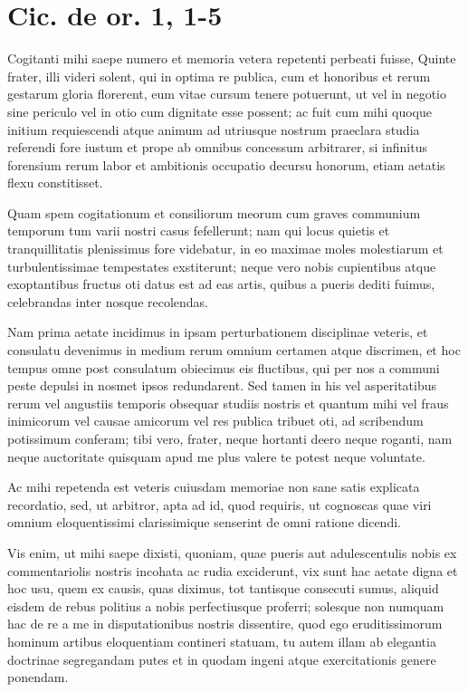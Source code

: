 

\section*{Cic. de or. 1, 1-5}

Cogitanti mihi saepe numero et memoria vetera repetenti perbeati fuisse, Quinte frater, illi videri solent, qui in optima re publica, cum et honoribus et rerum gestarum gloria florerent, eum vitae cursum tenere potuerunt, ut vel in negotio sine periculo vel in otio cum dignitate esse possent; ac fuit cum mihi quoque initium requiescendi atque animum ad utriusque nostrum praeclara studia referendi fore iustum et prope ab omnibus concessum arbitrarer, si infinitus forensium rerum labor et ambitionis occupatio decursu honorum, etiam aetatis flexu constitisset.

Quam spem cogitationum et consiliorum meorum cum graves communium temporum tum varii nostri casus fefellerunt; nam qui locus quietis et tranquillitatis plenissimus fore videbatur, in eo maximae moles molestiarum et turbulentissimae tempestates exstiterunt; neque vero nobis cupientibus atque exoptantibus fructus oti datus est ad eas artis, quibus a pueris dediti fuimus, celebrandas inter nosque recolendas.

Nam prima aetate incidimus in ipsam perturbationem disciplinae veteris, et consulatu devenimus in medium rerum omnium certamen atque discrimen, et hoc tempus omne post consulatum obiecimus eis fluctibus, qui per nos a communi peste depulsi in nosmet ipsos redundarent. Sed tamen in his vel asperitatibus rerum vel angustiis temporis obsequar studiis nostris et quantum mihi vel fraus inimicorum vel causae amicorum vel res publica tribuet oti, ad scribendum potissimum conferam; tibi vero, frater, neque hortanti deero neque roganti, nam neque auctoritate quisquam apud me plus valere te potest neque voluntate.

Ac mihi repetenda est veteris cuiusdam memoriae non sane satis explicata recordatio, sed, ut arbitror, apta ad id, quod requiris, ut cognoscas quae viri omnium eloquentissimi clarissimique senserint de omni ratione dicendi.

Vis enim, ut mihi saepe dixisti, quoniam, quae pueris aut adulescentulis nobis ex commentariolis nostris incohata ac rudia exciderunt, vix sunt hac aetate digna et hoc usu, quem ex causis, quas diximus, tot tantisque consecuti sumus, aliquid eisdem de rebus politius a nobis perfectiusque proferri; solesque non numquam hac de re a me in disputationibus nostris dissentire, quod ego eruditissimorum hominum artibus eloquentiam contineri statuam, tu autem illam ab elegantia doctrinae segregandam putes et in quodam ingeni atque exercitationis genere ponendam.


